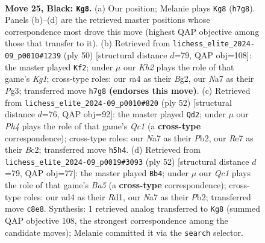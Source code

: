 \documentclass[11pt]{article}
\begin{document}
\clearpage

\begin{figure}[p]\centering
\begin{subfigure}{0.46\textwidth}\centering
\resizebox{\linewidth}{!}{%
\newchessgame
\chessboard[
  setfen={1rq2b2/n1p1r2k/p2p1pp1/3P3p/RP1NP3/4R2P/3B1PP1/1Q3K2 b - - 0 25},
  showmover=false,
  pgfstyle=straightmove, color=movearrow, markmove={h7-g8}
]}
\caption{}
\end{subfigure}\hfill
\begin{subfigure}{0.46\textwidth}\centering
\resizebox{\linewidth}{!}{%
\newchessgame
\chessboard[
  setfen={2rq4/p4pk1/2r1p1p1/1R1p1b1p/3P1P1P/P1P3P1/1Q2P1B1/2R3K1 w - - 3 26},
  showmover=false,
  pgfstyle=straightmove, color=movearrow, markmove={g1-f2}
]}
\caption{}
\end{subfigure}
\\[4pt]
\begin{subfigure}{0.46\textwidth}\centering
\resizebox{\linewidth}{!}{%
\newchessgame
\chessboard[
  setfen={3r2k1/pp3p1p/6pq/2np3r/2p5/2P1PPRP/PPB2P1K/R1Q5 w - - 0 27},
  showmover=false,
  pgfstyle=straightmove, color=movearrow, markmove={c1-d2}
]}
\caption{}
\end{subfigure}\hfill
\begin{subfigure}{0.46\textwidth}\centering
\resizebox{\linewidth}{!}{%
\newchessgame
\chessboard[
  setfen={2r2r1k/4b2p/p2ppppP/Bp3q2/8/P3R3/1PPQ1PP1/1K1R4 w - - 2 27},
  showmover=false,
  pgfstyle=straightmove, color=movearrow, markmove={a5-b4}
]}
\caption{}
\end{subfigure}
\caption{\textbf{Move 25, Black: \texttt{Kg8}.} (a) Our position; Melanie plays \texttt{Kg8} (\texttt{h7g8}). Panels (b)--(d) are the retrieved master positions whose correspondence most drove this move (highest QAP objective among those that transfer to it). (b) Retrieved from \texttt{lichess\_elite\_2024-09\_p0010\#1239} (ply 50) [structural distance $d$=79, QAP obj=108]: the master played \texttt{Kf2}; under $\mu$ our \emph{Kh2} plays the role of that game's \emph{Kg1}; cross-type roles: our \emph{r}a4 as their \emph{B}g2, our \emph{N}a7 as their \emph{P}g3; transferred move \texttt{h7g8} \textbf{(endorses this move)}. (c) Retrieved from \texttt{lichess\_elite\_2024-09\_p0010\#820} (ply 52) [structural distance $d$=76, QAP obj=92]: the master played \texttt{Qd2}; under $\mu$ our \emph{Ph4} plays the role of that game's \emph{Qc1} (a \textbf{cross-type} correspondence); cross-type roles: our \emph{N}a7 as their \emph{P}b2, our \emph{R}e7 as their \emph{B}c2; transferred move \texttt{h5h4}. (d) Retrieved from \texttt{lichess\_elite\_2024-09\_p0019\#3093} (ply 52) [structural distance $d$=79, QAP obj=77]: the master played \texttt{Bb4}; under $\mu$ our \emph{Qc1} plays the role of that game's \emph{Ba5} (a \textbf{cross-type} correspondence); cross-type roles: our \emph{n}d4 as their \emph{R}d1, our \emph{N}a7 as their \emph{P}b2; transferred move \texttt{c8e8}. Synthesis: 1 retrieved analog transferred to \texttt{Kg8} (summed QAP objective 108, the strongest correspondence among the candidate moves); Melanie committed it via the \texttt{search} selector.}
\label{fig:thought-m49}
\end{figure}
\end{document}
